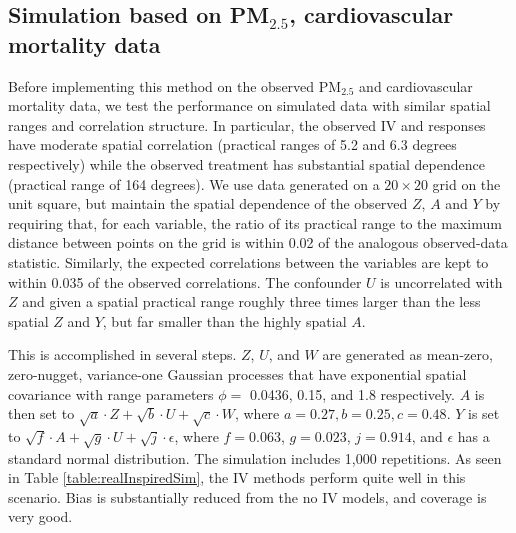 \documentclass[12pt]{article}
\begin{document}
\subsection{Simulation based on PM$_{2.5}$, cardiovascular mortality data} \label{ss3:realInspiredSim}

Before implementing this method on the observed PM$_{2.5}$ and cardiovascular mortality data, we test the performance on simulated data with similar spatial ranges and correlation structure. In particular, the observed IV and responses have moderate spatial correlation (practical ranges of 5.2 and 6.3 degrees respectively) while the observed treatment has substantial spatial dependence (practical range of 164 degrees). We use data generated on a $20 \times 20$ grid on the unit square, but maintain the spatial dependence of the observed $Z$, $A$ and $Y$ by requiring that, for each variable, the ratio of its practical range to the maximum distance between points on the grid is within 0.02 of the analogous observed-data statistic.  Similarly, the expected correlations between the variables are kept to within 0.035 of the observed correlations. The confounder $U$ is uncorrelated with $Z$ and given a spatial practical range roughly three times larger than the less spatial $Z$ and $Y$, but far smaller than the highly spatial $A$.
 
This is accomplished in several steps. $Z$, $U$, and $W$ are generated as mean-zero, zero-nugget, variance-one Gaussian processes that have exponential spatial covariance with range parameters $\phi =$ 0.0436, 0.15, and 1.8 respectively. $A$ is then set to $\sqrt{a}\cdot Z + \sqrt{b}\cdot U + \sqrt{c}\cdot W$, where $a=0.27, b=0.25, c=0.48$. $Y$ is set to $\sqrt{f}\cdot A + \sqrt{g}\cdot U + \sqrt{j}\cdot\epsilon$, where $f =0.063$, $g =0.023$, $j =0.914$, and $\epsilon$ has a standard normal distribution. The simulation includes 1,000 repetitions. As seen in Table \ref{table:realInspiredSim}, the IV methods perform quite well in this scenario. Bias is substantially reduced from the no IV models, and coverage is very good.
\end{document}
